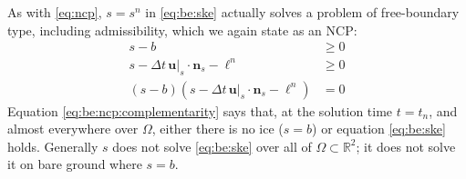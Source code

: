 \documentclass[hidelinks,onefignum,onetabnum,final]{siamart220329}  %
\newcommand{\RR}{\mathbb{R}}
\newcommand{\bn}{\mathbf{n}}
\newcommand{\bu}{\mathbf{u}}
\begin{document}
As with \eqref{eq:ncp}, $s=s^n$ in \eqref{eq:be:ske} actually solves a problem of free-boundary type, including admissibility, which we again state as an NCP:
\begin{subequations}
\label{eq:be:ncp}
\begin{align}
s - b &\ge 0 \label{eq:be:ncp:constraint} \\
s - \Delta t\,\bu|_s \cdot \bn_s - \ell^n &\ge 0 \label{eq:be:ncp:residualpos} \\
(s - b) \left(s - \Delta t\,\bu|_s \cdot \bn_s - \ell^n\right) &= 0 \label{eq:be:ncp:complementarity}
\end{align}
\end{subequations}
Equation \eqref{eq:be:ncp:complementarity} says that, at the solution time $t=t_n$, and almost everywhere over $\Omega$, either there is no ice ($s=b$) or equation \eqref{eq:be:ske} holds.  Generally $s$ does not solve \eqref{eq:be:ske} over all of $\Omega \subset \RR^2$; it does not solve it on bare ground where $s=b$.
\end{document}
